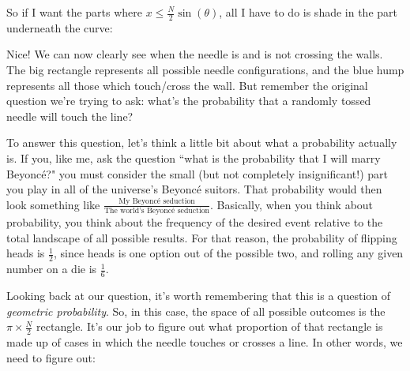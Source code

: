 \documentclass[11pt,titlepage]{article}
\begin{document}
So if I want the parts where $x \leq \frac{N}{2}\sin{(\theta)}$, all I have to do is shade in the part underneath the curve:
\begin{center}
\end{center}

Nice! We can now clearly see when the needle is and is not crossing the walls. The big rectangle represents all possible needle configurations, and the blue hump represents all those which touch/cross the wall. But remember the original question we're trying to ask: what's the probability that a randomly tossed needle will touch the line?

To answer this question, let's think a little bit about what a probability actually is. If you, like me, ask the question ``what is the probability that I will marry Beyonc\'{e}?" you must consider the small (but not completely insignificant!) part you play in all of the universe's Beyonc\'{e} suitors. That probability would then look something like $\frac{\text{My Beyonc\'{e} seduction}}{\text{The world's Beyonc\'{e} seduction}}$. Basically, when you think about probability, you think about the frequency of the desired event relative to the total landscape of all possible results. For that reason, the probability of flipping heads is $\frac{1}{2}$, since heads is one option out of the possible two, and rolling any given number on a die is $\frac{1}{6}$. 

Looking back at our question, it's worth remembering that this is a question of \textit{geometric probability}. So, in this case, the space of all possible outcomes is the $\pi \times \frac{N}{2}$ rectangle. It's our job to figure out what proportion of that rectangle is made up of cases in which the needle touches or crosses a line. In other words, we need to figure out:
\end{document}
